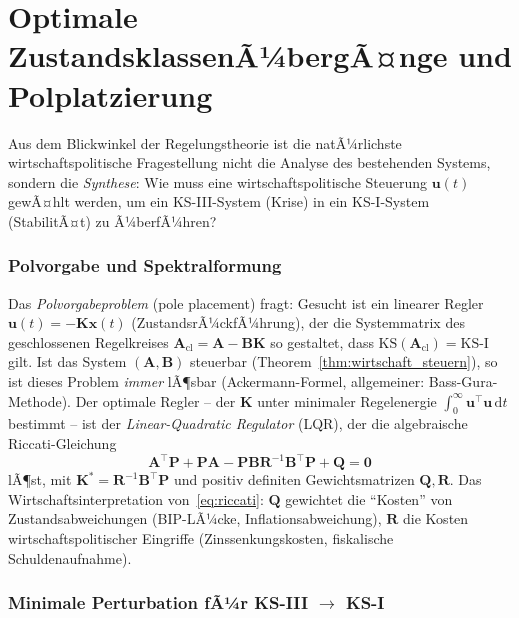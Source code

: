 ﻿\documentclass[12pt, a4paper, titlepage]{report}
\theoremstyle{definition}
\theoremstyle{remark}
\newcommand{\vx}{\bm{x}}
\newcommand{\vu}{\bm{u}}
\newcommand{\vA}{\bm{A}}
\newcommand{\vB}{\bm{B}}
\newcommand{\vP}{\bm{P}}
\newcommand{\vQ}{\bm{Q}}
\newcommand{\vK}{\bm{K}}
\newcommand{\vR}{\bm{R}}
\newcommand{\T}{\top}
\newcommand{\KS}{\mathrm{KS}}
\begin{document}
\section{Optimale ZustandsklassenÃ¼bergÃ¤nge und Polplatzierung}
\label{subsec:polplatz}

Aus dem Blickwinkel der Regelungstheorie ist die natÃ¼rlichste wirtschaftspolitische
Fragestellung nicht die Analyse des bestehenden Systems, sondern die
\emph{Synthese}: Wie muss eine wirtschaftspolitische Steuerung $\vu(t)$ gewÃ¤hlt
werden, um ein KS-III-System (Krise) in ein KS-I-System (StabilitÃ¤t)
zu Ã¼berfÃ¼hren?

\subsubsection*{Polvorgabe und Spektralformung}

Das \emph{Polvorgabeproblem} (pole placement) fragt: Gesucht ist ein linearer
Regler $\vu(t) = -\vK\vx(t)$ (ZustandsrÃ¼ckfÃ¼hrung), der die Systemmatrix des
geschlossenen Regelkreises $\vA_{\mathrm{cl}} = \vA - \vB\vK$ so gestaltet, dass
$\KS(\vA_{\mathrm{cl}}) = \KS\text{-I}$ gilt. Ist das System $(\vA, \vB)$ steuerbar
(Theorem~\ref{thm:wirtschaft_steuern}), so ist dieses Problem \emph{immer} lÃ¶sbar
(Ackermann-Formel, allgemeiner: Bass-Gura-Methode). Der optimale Regler -- der
$\vK$ unter minimaler Regelenergie $\int_0^\infty \vu^\T\vu\,\mathrm{d}t$ bestimmt --
ist der \emph{Linear-Quadratic Regulator} (LQR), der die algebraische Riccati-Gleichung
\begin{equation}
  \vA^\T\vP + \vP\vA - \vP\vB\vR^{-1}\vB^\T\vP + \vQ = \bm{0}
  \label{eq:riccati}
\end{equation}
lÃ¶st, mit $\vK^* = \vR^{-1}\vB^\T\vP$ und positiv definiten Gewichtsmatrizen
$\vQ, \vR$. Das Wirtschaftsinterpretation von~\eqref{eq:riccati}: $\vQ$ gewichtet
die ``Kosten'' von Zustandsabweichungen (BIP-LÃ¼cke, Inflationsabweichung),
$\vR$ die Kosten wirtschaftspolitischer Eingriffe (Zinssenkungskosten,
fiskalische Schuldenaufnahme).

\subsubsection*{Minimale Perturbation fÃ¼r KS-III $\to$ KS-I}
\end{document}
